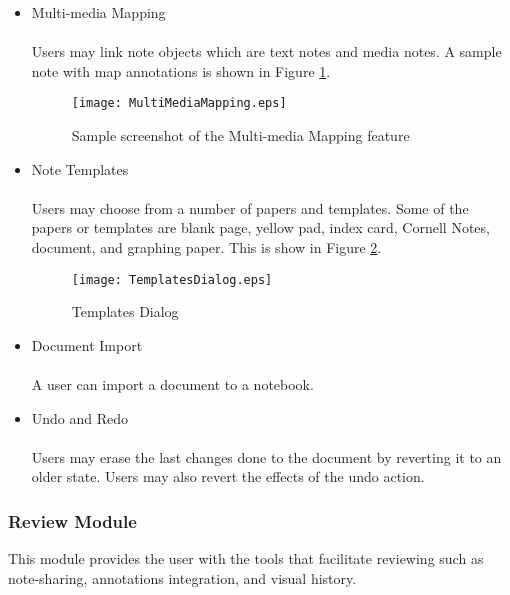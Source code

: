 \begin{itemize}
\item Multi-media Mapping
\\\\Users may link note objects which are text notes and media notes. A sample note with map annotations is shown in Figure \ref{fig:multimediamapping}.

\begin{figure}[htbp!]
   \centering   
   \texttt{[image: MultiMediaMapping.eps]}
   \caption{Sample screenshot of the Multi-media Mapping feature}
   \label{fig:multimediamapping}
\end{figure}

\item Note Templates
\\\\Users may choose from a number of papers and templates. Some of the papers or templates are blank page, yellow pad, index card, Cornell Notes, document, and graphing paper. This is show in Figure \ref{fig:templatesdialog}.

\begin{figure}[htbp!] 
   \centering         
   \texttt{[image: TemplatesDialog.eps]}  
   \caption{Templates Dialog}
   \label{fig:templatesdialog}
\end{figure}

\item Document Import
\\\\A user can import a document to a notebook.
\item Undo and Redo
\\\\Users may erase the last changes done to the document by reverting it to an older state. Users may also revert the effects of the undo action.
\end{itemize}

\subsubsection{Review Module}
\label{sec:reviewmodule}

This module provides the user with the tools that facilitate reviewing such as note-sharing, annotations integration, and visual history.

